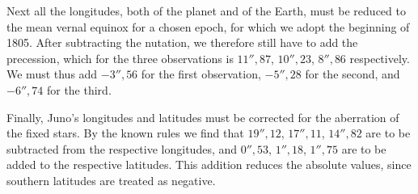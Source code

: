 Next all the longitudes, both of the planet and of the Earth, must be reduced to the mean vernal equinox for a chosen epoch, for which we adopt the beginning of 1805. After subtracting the nutation, we therefore still have to add the precession, which for the three observations is $11''{,}87$, $10''{,}23$, $8''{,}86$ respectively. We must thus add $-3''{,}56$ for the first observation, $-5''{,}28$ for the second, and $-6''{,}74$ for the third.

Finally, Juno's longitudes and latitudes must be corrected for the aberration of the fixed stars. By the known rules we find that $19''{,}12$, $17''{,}11$, $14''{,}82$ are to be subtracted from the respective longitudes, and $0''{,}53$, $1''{,}18$, $1''{,}75$ are to be added to the respective latitudes. This addition reduces the absolute values, since southern latitudes are treated as negative.
